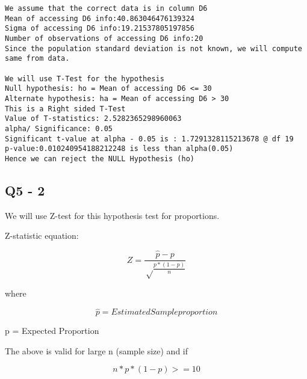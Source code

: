 \documentclass[11pt]{article}
\begin{document}
    \begin{Verbatim}[commandchars=\\\{\}]
We assume that the correct data is in column D6
Mean of accessing D6 info:40.863046476139324
Sigma of accessing D6 info:19.21537805197856
Number of observations of accessing D6 info:20
Since the population standard deviation is not known, we will compute same from data.

We will use T-Test for the hypothesis
Null hypothesis: ho = Mean of accessing D6 <= 30
Alternate hypothesis: ha = Mean of accessing D6 > 30
This is a Right sided T-Test
Value of T-statistics: 2.5282365298960063
alpha/ Significance: 0.05
Significant t-value at alpha - 0.05 is : 1.7291328115213678 @ df 19
p-value:0.010240954188212248 is less than alpha(0.05)
Hence we can reject the NULL Hypothesis (ho)

    \end{Verbatim}

    \subsection{Q5 - 2}\label{q5---2}

We will use Z-test for this hypothesis test for proportions.

Z-statistic equation:

\begin{equation*} Z = {\frac{\hat p - p} {\sqrt \frac{p * (1 - p)}{n}}} \end{equation*}

where

\begin{equation*} \hat p = Estimated Sample proportion \end{equation*}

p = Expected Proportion

The above is valid for large n (sample size) and if

\begin{equation*} n * p * (1-p) >= 10 \end{equation*}
\end{document}
